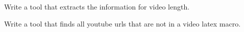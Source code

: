 \begin{comment}
The previous work even summarized the video length by chapter.

see: https://piazza.com/class/j5wll7vzylg25j?cid=325
\end{comment}

\begin{exercise}
Write a tool that extracts the information for video length. 
\end{exercise}

\begin{exercise}
Write a tool that finds all youtube urls that are not in a video latex
macro.
\end{exercise}